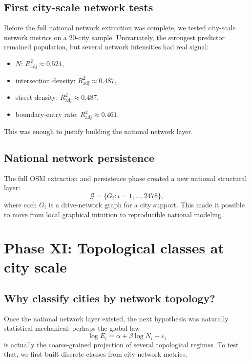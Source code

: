 \documentclass[11pt]{article}
\newcommand{\adjR}{R^2_{\mathrm{adj}}}
\begin{document}
\subsection{First city-scale network tests}

Before the full national network extraction was complete, we tested city-scale network metrics on a \(20\)-city sample. Univariately, the strongest predictor remained population, but several network intensities had real signal:
\begin{itemize}
\item \(N\): \(\adjR \approx 0.524\),
\item intersection density: \(\adjR \approx 0.487\),
\item street density: \(\adjR \approx 0.487\),
\item boundary-entry rate: \(\adjR \approx 0.461\).
\end{itemize}

This was enough to justify building the national network layer.

\subsection{National network persistence}

The full OSM extraction and persistence phase created a new national structural layer:
\begin{equation}
\mathcal{G}
=
\{
G_i : i=1,\dots,2478
\},
\end{equation}
where each \(G_i\) is a drive-network graph for a city support. This made it possible to move from local graphical intuition to reproducible national modeling.

\section{Phase XI: Topological classes at city scale}

\subsection{Why classify cities by network topology?}

Once the national network layer existed, the next hypothesis was naturally statistical-mechanical: perhaps the global law
\begin{equation}
\log E_i = \alpha + \beta \log N_i + \varepsilon_i
\end{equation}
is actually the coarse-grained projection of several topological regimes. To test that, we first built discrete classes from city-network metrics.
\end{document}

